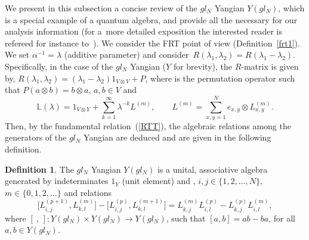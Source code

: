 \documentclass[10pt,a4paper]{amsart}
\numberwithin{equation}{section}
\theoremstyle{definition}
\newtheorem{defn}[thm]{Definition}
\def\mathfrak#1{#1}%
\def\mathcal#1{#1}%
\begin{document}
We present in this subsection a concise review of the $\mathfrak{gl}_{\mathcal N}$ Yangian
${\mathcal Y}(\mathfrak{gl}_{\mathcal N})$, which is a special example of a quantum algebra, and provide all the necessary for our analysis information (for a~more detailed exposition the interested reader is refereed for instance to~\cite{Chari, Molev}). We consider the FRT point of view (Definition~\ref{frt1}). We set $\alpha^{-1}=\lambda$ (additive parameter) and consider~${R(\lambda_1, \lambda_2)= R(\lambda_1 - \lambda_2)}$. Specifically, in the case of the $\mathfrak{gl}_{\mathcal N}$ Yangian (${\mathcal Y}$ for brevity), the $R$-matrix is given by, $R(\lambda_1, \lambda_2) = (\lambda_1 - \lambda_2) 1_{V \otimes V} + {\mathcal P}$, where \smash{${\mathcal P} = \sum_{i,j =1}^{\mathcal N} e_{i,j} \otimes e_{j,i}$} is the permutation operator such that ${\mathcal P}(a\otimes b) = b \otimes a$, $a,b \in V$ and
\[
{\mathbb L}(\lambda) = 1_{V \otimes {\mathcal Y}} + \sum_{k=1}^{\infty} \lambda^{-k} L^{(m)}, \qquad
L^{(m)} = \sum_{x,y=1}^{\mathcal N} e_{x,y} \otimes L_{x,y}^{(m)}.
\]
 Then, by the fundamental relation~(\ref{RTT}), the algebraic relations among the generators  of the $\mathfrak{gl}_{\mathcal N}$ Yangian are deduced and are given in the following definition.
\begin{defn}
The $\mathfrak{gl}_{\mathcal N}$ Yangian ${\mathcal Y}(\mathfrak{gl}_{\mathcal N})$ is a unital, associative algebra generated by indetermi\-nates $1_{\mathcal Y}$ (unit element) and , $i,j \in \{1,2,\dots,{\mathcal N}\}$, $m \in \{0,1,2,\dots\}$ and relations
\begin{equation}
\bigl[ L_{i,j}^{(p+1)}, L_{k,l}^{(m)}\bigr] -\bigl[ L_{i,j}^{(p)}, L_{k,l}^{(m+1)}\bigr] = L_{k,j}^{(m)}L_{i,l}^{(p)}- L_{k,j}^{(p)}L_{i,l}^{(m)}, \label{fund2b}
\end{equation}
where $[ \ ,\, ]\colon {\mathcal Y}(\mathfrak{gl}_{\mathcal N})\times {\mathcal Y}(\mathfrak{gl}_{\mathcal N})\to {\mathcal Y}(\mathfrak{gl}_{\mathcal N})$, such that $[a, b] = ab - ba$, for all $a,b \in {\mathcal Y}(\mathfrak{gl}_{\mathcal N})$.
\end{defn}
\end{document}
